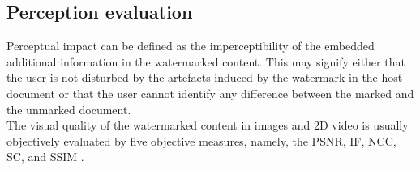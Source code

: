 \subsection{Perception evaluation}

Perceptual impact can be defined as the imperceptibility of the embedded additional information in the watermarked content. This may signify either that the user is not disturbed by the artefacts induced by the watermark in the host document or that the user cannot identify any difference between the marked and the unmarked document.\\
The visual quality of the watermarked content in images and 2D video is usually objectively evaluated by five objective measures, namely, the PSNR, IF, NCC, SC, and SSIM \cite{METRICS}.\\

